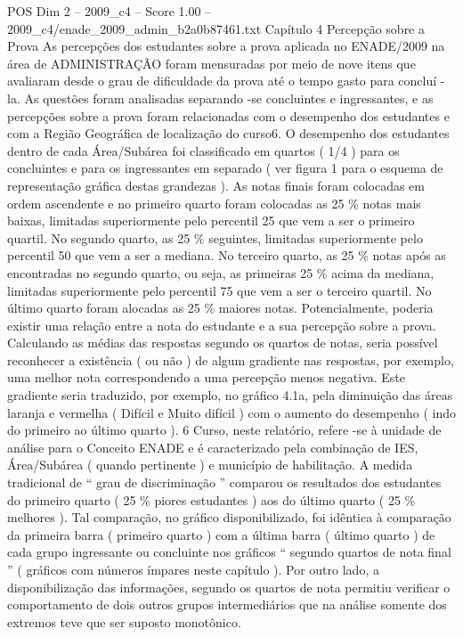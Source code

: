 \begin{textsample}{POS Dim 2 – 2009\_c4 – Score 1.00 – 2009\_c4/enade\_2009\_admin\_b2a0b87461.txt}  \label{ex:f2_pos_203}
Capítulo 4 Percepção sobre a Prova As percepções dos estudantes sobre a prova aplicada no ENADE/2009 na área de ADMINISTRAÇÃO foram mensuradas por meio de nove itens que avaliaram desde o grau de dificuldade da prova até o tempo gasto para concluí -la.
As questões foram analisadas separando -se concluintes e ingressantes, e as percepções sobre a prova foram relacionadas com o desempenho dos estudantes e com a Região Geográfica de localização do curso6.
O desempenho dos estudantes dentro de cada Área/Subárea foi classificado em quartos ( 1/4 ) para os concluintes e para os ingressantes em separado ( ver figura 1 para o esquema de representação gráfica destas grandezas ).
As notas finais foram colocadas em ordem ascendente e no primeiro quarto foram colocadas as 25 \% notas mais baixas, limitadas superiormente pelo percentil 25 que vem a ser o primeiro quartil.
No segundo quarto, as 25 \% seguintes, limitadas superiormente pelo percentil 50 que vem a ser a mediana.
No terceiro quarto, as 25 \% notas após as encontradas no segundo quarto, ou seja, as primeiras 25 \% acima da mediana, limitadas superiormente pelo percentil 75 que vem a ser o terceiro quartil.
No último quarto foram alocadas as 25 \% maiores notas.
Potencialmente, poderia existir uma relação entre a nota do estudante e a sua percepção sobre a prova.
Calculando as médias das respostas segundo os quartos de notas, seria possível reconhecer a existência ( ou não ) de algum gradiente nas respostas, por exemplo, uma melhor nota correspondendo a uma percepção menos negativa.
Este gradiente seria traduzido, por exemplo, no gráfico 4.1a, pela diminuição das áreas laranja e vermelha ( Difícil e Muito difícil ) com o aumento do desempenho ( indo do primeiro ao último quarto ). 6 Curso, neste relatório, refere -se à unidade de análise para o Conceito ENADE e é caracterizado pela combinação de IES, Área/Subárea ( quando pertinente ) e município de habilitação.
A medida tradicional de “ grau de discriminação ” comparou os resultados dos estudantes do primeiro quarto ( 25 \% piores estudantes ) aos do último quarto ( 25 \% melhores ).
Tal comparação, no gráfico disponibilizado, foi idêntica à comparação da primeira barra ( primeiro quarto ) com a última barra ( último quarto ) de cada grupo ingressante ou concluinte nos gráficos “ segundo quartos de nota final ” ( gráficos com números ímpares neste capítulo ).
Por outro lado, a disponibilização das informações, segundo os quartos de nota permitiu verificar o comportamento de dois outros grupos intermediários que na análise somente dos extremos teve que ser suposto monotônico.

\end{textsample}
